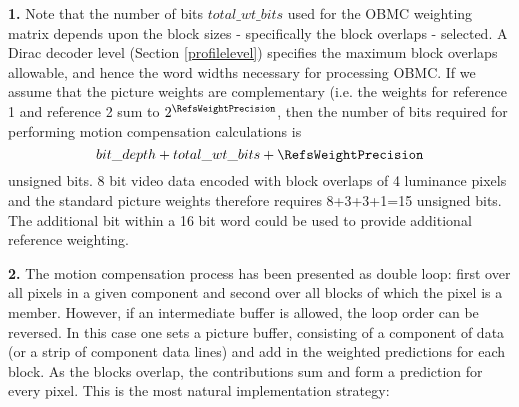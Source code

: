 \begin{informative}

{\bf 1.} Note that the number of bits $total\_wt\_bits$ used for 
the OBMC weighting matrix depends upon the block sizes - specifically
the block overlaps - selected. A Dirac decoder level (Section \ref{profilelevel}) 
specifies the maximum block overlaps allowable, and hence 
the word widths necessary for processing OBMC. If we assume that 
the picture weights are complementary (i.e. the weights
for reference 1 and reference 2 sum to $2^\RefsWeightPrecision$, 
then the number of bits required for performing motion compensation 
calculations is \[bit\_depth+total\_wt\_bits+\RefsWeightPrecision\]
unsigned bits. 8 bit video data encoded with block overlaps of 4 
luminance pixels and the standard picture weights therefore
requires 8+3+3+1=15 unsigned bits. The additional bit within 
a 16 bit word could be used to provide additional reference 
weighting.


{\bf 2.} The motion compensation process has been presented as double 
loop: first over all pixels in a given component and second over all 
blocks of which the pixel is a member. However, if an intermediate
buffer is allowed, the loop order can be reversed. In this case 
one sets a picture buffer, consisting of 
a component of data (or a strip of component data lines) and 
add in the weighted predictions for each block. As the
blocks overlap, the contributions sum and form a prediction 
for every pixel. This is the most natural implementation
strategy:

\begin{pseudo*}
            \bsELSE
            \bsEND
        \bsEND
    \bsEND
\bsEND
{}
    \bsEND
\bsEND
\end{pseudo*}


\end{informative}
